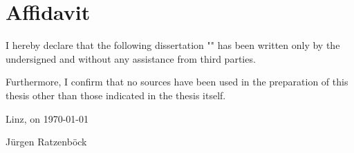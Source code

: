 \chapter*{Affidavit}

I hereby declare that the following dissertation "\thesistitle{}" has been written
only by the undersigned and without any assistance from third parties.

Furthermore, I confirm that no sources have been used in the preparation of this thesis other than those indicated in the thesis itself.

Linz, on \today

\hfill J\"urgen Ratzenb\"ock
